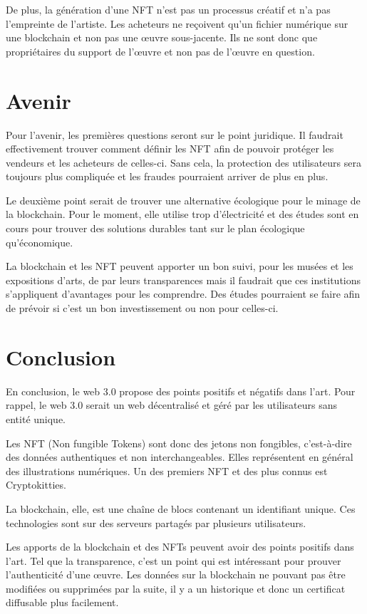 \documentclass[11pt]{article}
\begin{document}
De plus, la génération d'une NFT n'est pas un processus créatif et n'a pas l'empreinte de l'artiste. Les acheteurs ne reçoivent qu'un fichier numérique sur une blockchain et non pas une œuvre sous-jacente. Ils ne sont donc que propriétaires du support de l'œuvre et non pas de l'œuvre en question.  \cite{meghraoui_les_2022}

\section{Avenir} %
Pour l'avenir, les premières questions seront sur le point juridique. Il faudrait effectivement trouver comment définir les NFT afin de pouvoir protéger les vendeurs et les acheteurs de celles-ci. Sans cela, la protection des utilisateurs sera toujours plus compliquée et les fraudes pourraient arriver de plus en plus. 

Le deuxième point serait de trouver une alternative écologique pour le minage de la blockchain. Pour le moment, elle utilise trop d'électricité et des études sont en cours pour trouver des solutions durables tant sur le plan écologique qu'économique. 

La blockchain et les NFT peuvent apporter un bon suivi, pour les musées et les expositions d'arts, de par leurs transparences mais il faudrait que ces institutions s'appliquent d'avantages pour les comprendre. Des études pourraient se faire afin de prévoir si c'est un bon investissement ou non pour celles-ci. 
\section{Conclusion} %
En conclusion, le web 3.0 propose des points positifs et négatifs dans l'art. 
Pour rappel, le web 3.0 serait un web décentralisé et géré par les utilisateurs sans entité unique.

Les NFT (Non fungible Tokens) sont donc des jetons non fongibles, c'est-à-dire des données authentiques et non interchangeables. Elles représentent en général des illustrations numériques. Un des premiers NFT et des plus connus est Cryptokitties. 

La blockchain, elle, est une chaîne de blocs contenant un identifiant unique. Ces technologies sont sur des serveurs partagés par plusieurs utilisateurs. 

Les apports de la blockchain et des NFTs peuvent avoir des points positifs dans l'art. Tel que la transparence, c'est un point qui est intéressant pour prouver l'authenticité d'une œuvre. Les données sur la blockchain ne pouvant pas être modifiées ou supprimées par la suite, il y a un historique et donc un certificat diffusable plus facilement. 
\end{document}
